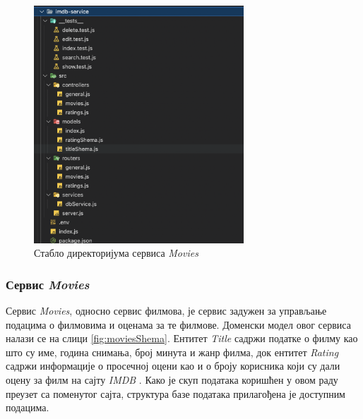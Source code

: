 \documentclass[12pt,oneside]{memoir}
\begin{document}
\begin{figure}[!ht]
  \centering
  \includegraphics[width=0.7\textwidth]{matfmaster/img/moviesTree.png}
  \caption{Стабло директоријума сервиса \textit{Movies}}
  \label{fig:moviesTree}
\end{figure}


\subsubsection{Сервис \textit{Movies}}

Сервис \textit{Movies}, односно сервис филмова, је сервис задужен за управљање подацима о филмовима и оценама за те филмове. Доменски модел овог сервиса налази се на слици \ref{fig:moviesShema}. Ентитет \textit{Title} садржи податке о филму као што су име, година снимања, број минута и жанр филма, док ентитет \textit{Rating} садржи информације о просечној оцени као и о броју корисника који су дали оцену за филм на сајту \textit{IMDB} \cite{imdb}. Како је скуп података коришћен у овом раду преузет са поменутог сајта, структура базе података прилагођена је доступним подацима.
\end{document}
